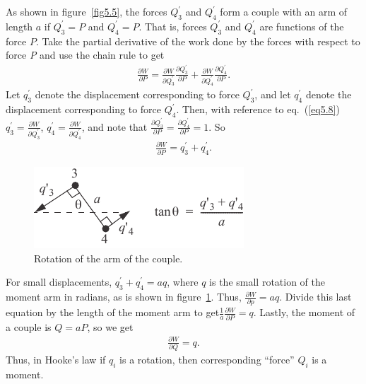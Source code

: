 \documentclass{AeroStructure-ERJohnson}
\begin{document}
As shown in figure~\ref{fig5.5}, the forces $ Q_{3}^{\prime} $ and $ Q_{4}^{\prime} $ form a couple with an arm of length $ a $ if $ Q_{3}^{\prime}=P $ and $ Q_{4}^{\prime}=P $. That is, forces $ Q_{3}^{\prime} $ and $ Q_{4}^{\prime} $ are functions of the force $ P $. Take the partial derivative of the work done by the forces with respect to force \textit{P} and use the chain rule to get
\begin{align*}
\frac{\partial W}{\partial P}=\frac{\partial W}{\partial Q_{3}^{\prime}} \frac{\partial Q_{3}^{\prime}}{\partial P}+\frac{\partial W}{\partial Q_{4}^{\prime}} \frac{\partial Q_{4}^{\prime}}{\partial P}.
\end{align*}
Let $ q_{3}^{\prime} $ denote the displacement corresponding to force $ Q_{3}^{\prime} $, and let $ q_{4}^{\prime} $ denote the displacement corresponding to force $ Q_{4}^{\prime} $. Then, with reference to eq.~(\ref{eq5.8}) $ q_{3}^{\prime}=\frac{\partial W}{\partial Q_{3}^{\prime}} $, $ q_{4}^{\prime}=\frac{\partial W}{\partial Q_{4}^{\prime}} $, and note that $ \frac{\partial Q_{3}^{\prime}}{\partial P}=\frac{\partial Q_{4}^{\prime}}{\partial P}=1 $. So
\begin{align*}
\frac{\partial W}{\partial P}=q_{3}^{\prime}+q_{4}^{\prime}.
\end{align*}

\begin{figure}
\includegraphics{Figure_5-6.pdf}
\caption{Rotation of the arm of the couple. \label{fig5.6}}
\end{figure}

\noindent For small displacements, $ q_{3}^{\prime}+q_{4}^{\prime}=a q $, where $q$ is the small rotation of the moment arm in radians, as is shown in figure~\ref{fig5.6}. Thus, $ \frac{\partial W}{\partial p}=a q $. Divide this last equation by the length of the moment arm to get\break $ \frac{1}{a} \frac{\partial W}{\partial P}=q $. Lastly, the moment of a couple is $ Q=a P $, so we get
\begin{align}\label{eq5.9}
\frac{\partial W}{\partial Q}=q .
\end{align}
Thus, in Hooke's law if $ q_{i}$ is a rotation, then corresponding ``force'' $Q_{i}$ is a moment.
\end{document}
